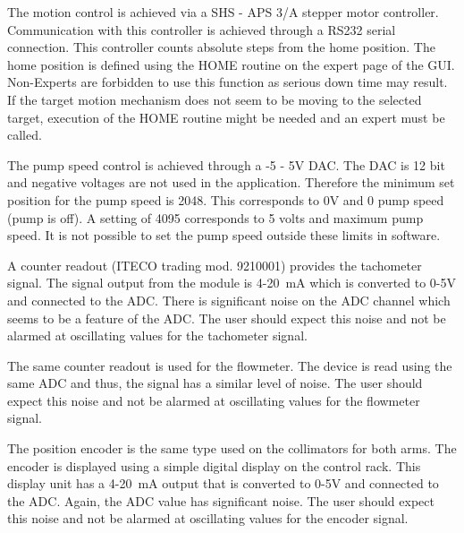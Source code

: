 {The motion control is achieved via a SHS - APS 3/A stepper motor controller.
Communication with this controller is achieved through a RS232 serial
connection. This controller counts absolute steps from the home position.
The home position is defined using the HOME routine on the expert page
of the GUI. Non-Experts are forbidden to use this function as serious
down time may result. If the target motion mechanism does not seem
to be moving to the selected target, execution of the HOME routine
might be needed and an expert must be called.

The pump speed control is achieved through a -5 - 5V DAC. The DAC
is 12 bit and negative voltages are not used in the application. Therefore
the minimum set position for the pump speed is 2048. This corresponds
to 0V and 0 pump speed (pump is off). A setting of 4095 corresponds
to 5 volts and maximum pump speed. It is not possible to set the pump
speed outside these limits in software.

A counter readout (ITECO trading mod. 9210001) provides the tachometer
signal. The signal output from the module is 4-20~mA which is converted
to 0-5V and connected to the ADC. There is significant noise on the
ADC channel which seems to be a feature of the ADC. The user should
expect this noise and not be alarmed at oscillating values for the
tachometer signal.

The same counter readout is used for the flowmeter. The device is
read using the same ADC and thus, the signal has a similar level of
noise. The user should expect this noise and not be alarmed at oscillating
values for the flowmeter signal.

The position encoder is the same type used on the collimators for both
arms. The encoder is displayed using a simple digital display on the
control rack. This display unit has a 4-20~mA output that is converted
to 0-5V and connected to the ADC. Again, the ADC value has significant
noise. The user should expect this noise and not be alarmed at oscillating
values for the encoder signal.


} %
